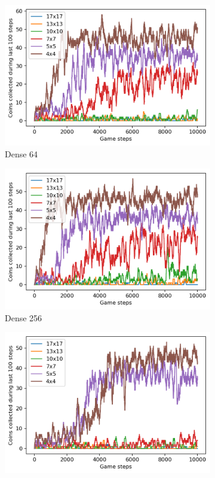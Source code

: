 \begin{figure}
  \centering
  \begin{subfigure}[b]{0.48\linewidth}
    \centering
    	\includegraphics[width=\linewidth]{images/minigame-dense64-arch.png}
    \caption{Dense 64}
  \end{subfigure}
  \quad
  \begin{subfigure}[b]{0.48\linewidth}
    \centering
      \includegraphics[width=\linewidth]{images/minigame-dense256-arch.png}
    \caption{Dense 256}
  \end{subfigure}
  \begin{subfigure}[b]{0.48\linewidth}
    \centering
    	\includegraphics[width=\linewidth]{images/minigame-conv8-4-3-arch.png}

\end{subfigure}
\end{figure}
